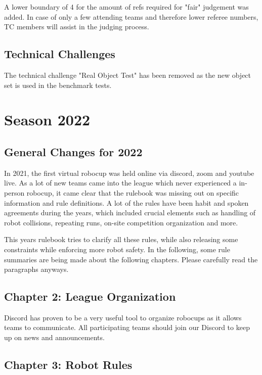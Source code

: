 A lower boundary of 4 for the amount of refs required for "fair" judgement was added.
In case of only a few attending teams and therefore lower referee numbers,
TC members will assist in the judging process.

\subsection{Technical Challenges}

The technical challenge "Real Object Test" has been removed as the new object set is used in the benchmark tests.



\section{Season 2022}

\subsection{General Changes for 2022}

In 2021, the first virtual robocup was held online via discord, zoom and youtube live.
As a lot of new teams came into the league which never experienced a in-person robocup,
it came clear that the rulebook was missing out on specific information and rule definitions.
A lot of the rules have been habit and spoken agreements during the years,
which included crucial elements such as handling of robot collisions, repeating runs,
on-site competition organization and more.

This years rulebook tries to clarify all these rules, while also releasing some constraints 
while enforcing more robot safety. In the following, 
some rule summaries are being made about the following chapters.
Please carefully read the paragraphs anyways.

\subsection{Chapter 2: League Organization}

Discord has proven to be a very useful tool to organize 
robocups as it allows teams to communicate. All participating teams should join our Discord to keep up on news and announcements.

\subsection{Chapter 3: Robot Rules}

